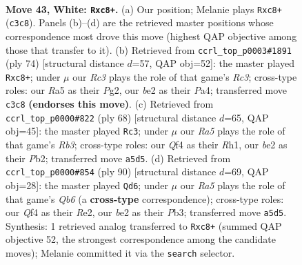 \documentclass[11pt]{article}
\begin{document}
\clearpage

\begin{figure}[p]\centering
\begin{subfigure}{0.46\textwidth}\centering
\resizebox{\linewidth}{!}{%
\newchessgame
\chessboard[
  setfen={1kr5/1p1n4/1r1p4/R7/1P2PQ2/2R5/K3b1PP/8 w - - 1 43},
  showmover=false,
  pgfstyle=straightmove, color=movearrow, markmove={c3-c8}
]}
\caption{}
\end{subfigure}\hfill
\begin{subfigure}{0.46\textwidth}\centering
\resizebox{\linewidth}{!}{%
\newchessgame
\chessboard[
  setfen={1rr3k1/4n1p1/8/8/P4PpP/1PR5/3K2P1/1R6 w - - 0 38},
  showmover=false,
  pgfstyle=straightmove, color=movearrow, markmove={c3-c8}
]}
\caption{}
\end{subfigure}
\\[4pt]
\begin{subfigure}{0.46\textwidth}\centering
\resizebox{\linewidth}{!}{%
\newchessgame
\chessboard[
  setfen={7r/p4p2/4rk2/2P5/8/1R2Nn2/PP3P1p/2K4R w - - 14 35},
  showmover=false,
  pgfstyle=straightmove, color=movearrow, markmove={b3-c3}
]}
\caption{}
\end{subfigure}\hfill
\begin{subfigure}{0.46\textwidth}\centering
\resizebox{\linewidth}{!}{%
\newchessgame
\chessboard[
  setfen={4r1k1/7p/1Q3R2/2pPr3/6Pq/1P2p2P/4R1K1/8 w - - 6 46},
  showmover=false,
  pgfstyle=straightmove, color=movearrow, markmove={b6-d6}
]}
\caption{}
\end{subfigure}
\caption{\textbf{Move 43, White: \texttt{Rxc8+}.} (a) Our position; Melanie plays \texttt{Rxc8+} (\texttt{c3c8}). Panels (b)--(d) are the retrieved master positions whose correspondence most drove this move (highest QAP objective among those that transfer to it). (b) Retrieved from \texttt{ccrl\_top\_p0003\#1891} (ply 74) [structural distance $d$=57, QAP obj=52]: the master played \texttt{Rxc8+}; under $\mu$ our \emph{Rc3} plays the role of that game's \emph{Rc3}; cross-type roles: our \emph{R}a5 as their \emph{P}g2, our \emph{b}e2 as their \emph{P}a4; transferred move \texttt{c3c8} \textbf{(endorses this move)}. (c) Retrieved from \texttt{ccrl\_top\_p0000\#822} (ply 68) [structural distance $d$=65, QAP obj=45]: the master played \texttt{Rc3}; under $\mu$ our \emph{Ra5} plays the role of that game's \emph{Rb3}; cross-type roles: our \emph{Q}f4 as their \emph{R}h1, our \emph{b}e2 as their \emph{P}b2; transferred move \texttt{a5d5}. (d) Retrieved from \texttt{ccrl\_top\_p0000\#854} (ply 90) [structural distance $d$=69, QAP obj=28]: the master played \texttt{Qd6}; under $\mu$ our \emph{Ra5} plays the role of that game's \emph{Qb6} (a \textbf{cross-type} correspondence); cross-type roles: our \emph{Q}f4 as their \emph{R}e2, our \emph{b}e2 as their \emph{P}b3; transferred move \texttt{a5d5}. Synthesis: 1 retrieved analog transferred to \texttt{Rxc8+} (summed QAP objective 52, the strongest correspondence among the candidate moves); Melanie committed it via the \texttt{search} selector.}
\label{fig:thought-m84}
\end{figure}
\end{document}
